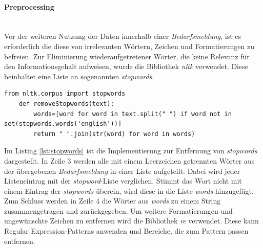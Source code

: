 \paragraph{Preprocessing}\mbox{}\\
Vor der weiteren Nutzung der Daten innerhalb einer \emph{Bedarfsmeldung}, ist es erforderlich die diese von irrelevanten Wörtern, Zeichen und Formatierungen zu befreien.%
Zur Eliminierung wiederaufgetretener Wörter, die keine Relevanz für den Informationsgehalt aufweisen, wurde die Bibliothek \emph{nltk} verwendet. Diese beinhaltet eine Liste an sogenannten \emph{stopwords}.
\begin{lstlisting}[caption={Implementation der Methode removeStopwords() des Moduls \emph{preprocessing.py}}, label=lst:stopwords]
	from nltk.corpus import stopwords
	def removeStopwords(text):
		words=[word for word in text.split(" ") if word not in set(stopwords.words('english'))]
		return " ".join(str(word) for word in words)
\end{lstlisting}
Im Listing \ref{lst:stopwords} ist die Implementierung zur Entfernung von \emph{stopwords} dargestellt. In Zeile 3 werden alle mit einem Leerzeichen getrennten Wörter aus der übergebenen \emph{Bedarfsmeldung} in einer Liste aufgeteilt. Dabei wird jeder Listeneintrag mit der \emph{stopword}-Liste verglichen. Stimmt das Wort nicht mit einem Eintrag der \emph{stopwords} überein, wird diese in die Liste \emph{words} hinzugefügt. Zum Schluss werden in Zeile 4 die Wörter aus \emph{words} zu einem String zusammengetragen und zurückgegeben. Um weitere Formatierungen und ungewünschte Zeichen zu entfernen wird die Bibliothek \emph{re} verwendet. Diese kann Regular Expression-Patterns anwenden und Bereiche, die zum Pattern passen entfernen.
